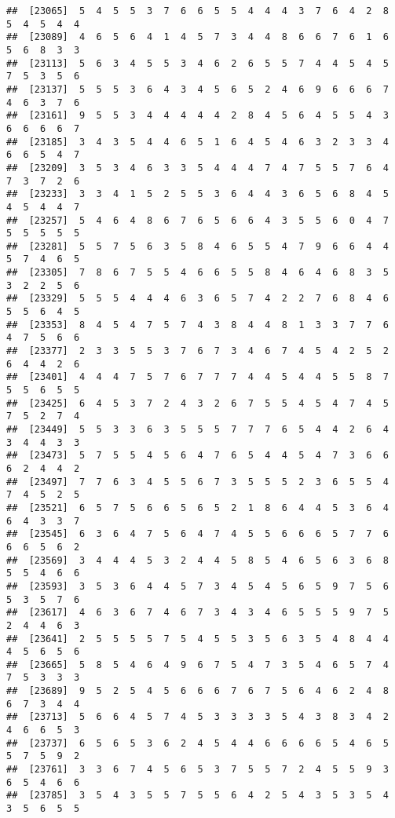 \documentclass[
]{book}
\begin{document}
\begin{verbatim}
##  [23065]  5  4  5  5  3  7  6  6  5  5  4  4  4  3  7  6  4  2  8  5  4  5  4  4
##  [23089]  4  6  5  6  4  1  4  5  7  3  4  4  8  6  6  7  6  1  6  5  6  8  3  3
##  [23113]  5  6  3  4  5  5  3  4  6  2  6  5  5  7  4  4  5  4  5  7  5  3  5  6
##  [23137]  5  5  5  3  6  4  3  4  5  6  5  2  4  6  9  6  6  6  7  4  6  3  7  6
##  [23161]  9  5  5  3  4  4  4  4  4  2  8  4  5  6  4  5  5  4  3  6  6  6  6  7
##  [23185]  3  4  3  5  4  4  6  5  1  6  4  5  4  6  3  2  3  3  4  6  6  5  4  7
##  [23209]  3  5  3  4  6  3  3  5  4  4  4  7  4  7  5  5  7  6  4  7  3  7  2  6
##  [23233]  3  3  4  1  5  2  5  5  3  6  4  4  3  6  5  6  8  4  5  4  5  4  4  7
##  [23257]  5  4  6  4  8  6  7  6  5  6  6  4  3  5  5  6  0  4  7  5  5  5  5  5
##  [23281]  5  5  7  5  6  3  5  8  4  6  5  5  4  7  9  6  6  4  4  5  7  4  6  5
##  [23305]  7  8  6  7  5  5  4  6  6  5  5  8  4  6  4  6  8  3  5  3  2  2  5  6
##  [23329]  5  5  5  4  4  4  6  3  6  5  7  4  2  2  7  6  8  4  6  5  5  6  4  5
##  [23353]  8  4  5  4  7  5  7  4  3  8  4  4  8  1  3  3  7  7  6  4  7  5  6  6
##  [23377]  2  3  3  5  5  3  7  6  7  3  4  6  7  4  5  4  2  5  2  6  4  4  2  6
##  [23401]  4  4  4  7  5  7  6  7  7  7  4  4  5  4  4  5  5  8  7  5  5  6  5  5
##  [23425]  6  4  5  3  7  2  4  3  2  6  7  5  5  4  5  4  7  4  5  7  5  2  7  4
##  [23449]  5  5  3  3  6  3  5  5  5  7  7  7  6  5  4  4  2  6  4  3  4  4  3  3
##  [23473]  5  7  5  5  4  5  6  4  7  6  5  4  4  5  4  7  3  6  6  6  2  4  4  2
##  [23497]  7  7  6  3  4  5  5  6  7  3  5  5  5  2  3  6  5  5  4  7  4  5  2  5
##  [23521]  6  5  7  5  6  6  5  6  5  2  1  8  6  4  4  5  3  6  4  6  4  3  3  7
##  [23545]  6  3  6  4  7  5  6  4  7  4  5  5  6  6  6  5  7  7  6  6  6  5  6  2
##  [23569]  3  4  4  4  5  3  2  4  4  5  8  5  4  6  5  6  3  6  8  5  5  4  6  6
##  [23593]  3  5  3  6  4  4  5  7  3  4  5  4  5  6  5  9  7  5  6  5  3  5  7  6
##  [23617]  4  6  3  6  7  4  6  7  3  4  3  4  6  5  5  5  9  7  5  2  4  4  6  3
##  [23641]  2  5  5  5  5  7  5  4  5  5  3  5  6  3  5  4  8  4  4  4  5  6  5  6
##  [23665]  5  8  5  4  6  4  9  6  7  5  4  7  3  5  4  6  5  7  4  7  5  3  3  3
##  [23689]  9  5  2  5  4  5  6  6  6  7  6  7  5  6  4  6  2  4  8  6  7  3  4  4
##  [23713]  5  6  6  4  5  7  4  5  3  3  3  3  5  4  3  8  3  4  2  4  6  6  5  3
##  [23737]  6  5  6  5  3  6  2  4  5  4  4  6  6  6  6  5  4  6  5  5  7  5  9  2
##  [23761]  3  3  6  7  4  5  6  5  3  7  5  5  7  2  4  5  5  9  3  6  5  4  6  6
##  [23785]  3  5  4  3  5  5  7  5  5  6  4  2  5  4  3  5  3  5  4  3  5  6  5  5

\end{verbatim}
\end{document}
